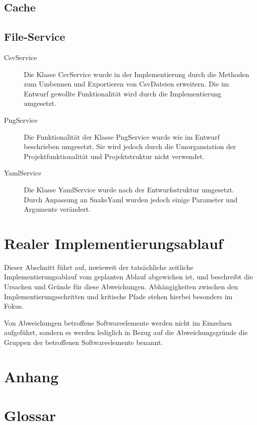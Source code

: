 \documentclass[parskip=full]{scrartcl}
\begin{document}
\subsection{Cache}

\subsection{File-Service}

\begin{description}
\item[CsvService] Die Klasse CsvService wurde in der Implementierung durch die Methoden zum Umbennen und Exportieren von CsvDateien erweitern. Die im Entwurf gewollte Funktionalität wird durch die Implementierung umgesetzt.
\item[PngService] Die Funktionalität der Klasse PngService wurde wie im Entwurf beschrieben umgesetzt. Sie wird jedoch durch die Umorgansiation der Projektfunktionalität und Projektstruktur nicht verwendet.
\item[YamlService] Die Klasse YamlService wurde nach der Entwurfsstruktur umgesetzt. Durch Anpassung an SnakeYaml wurden jedoch einige Parameter und Argumente verändert.

\end{description}

\section{Realer Implementierungsablauf}

Dieser Abschnitt führt auf, inwieweit der tatsächliche zeitliche Implementierungsablauf vom geplanten Ablauf abgewichen ist, und beschreibt die Ursachen und Gründe für diese Abweichungen. Abhängigkeiten zwischen den Implementierungsschritten und kritische Pfade stehen hierbei besonders im Fokus.

Von Abweichungen betroffene Softwareelemente werden nicht im Einzelnen aufgeführt, sondern es werden lediglich in Bezug auf die Abweichungsgründe die Gruppen der betroffenen Softwareelemente benannt.

\section{Anhang}



\clearpage
\section{Glossar}\label{glossar}

\renewcommand*{\glossarysection}[2][]{}	%
\printnoidxglossaries				%
\end{document}
